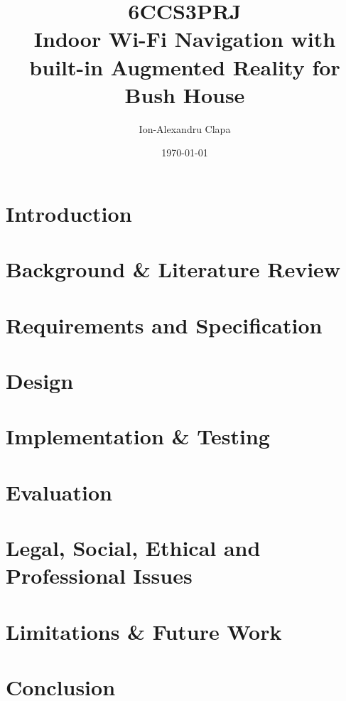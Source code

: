 \documentclass[12pt]{informatics-report}
\title{6CCS3PRJ\\\vspace{0.2cm}Indoor Wi-Fi Navigation with built-in Augmented Reality for Bush House}
\author{Ion-Alexandru Clapa}
\date{\today}
\begin{document}
{%
\setlength{\fboxsep}{0pt}%
\setlength{\fboxrule}{1pt}%
}%
\captionsetup{justification=centering,margin=2cm}


\createFrontMatter
\onehalfspacing
\tableofcontents
\doublespacing
\listoffigures
\listoftables

\makenomenclature
\renewcommand{\nomname}{Abbreviations}

\newpage

\onehalfspacing
\chapter{Introduction}

\newpage
\chapter{Background \& Literature Review}

\newpage
\chapter{Requirements and Specification}

\newpage
\chapter{Design}

\newpage
\chapter{Implementation \& Testing}

\newpage
\chapter{Evaluation}

\newpage
\chapter{Legal, Social, Ethical and Professional Issues}

\newpage
\chapter{Limitations \& Future Work}

\newpage
\chapter{Conclusion}


\newpage

\printnomenclature

\newpage



% 
% 
\end{document}

